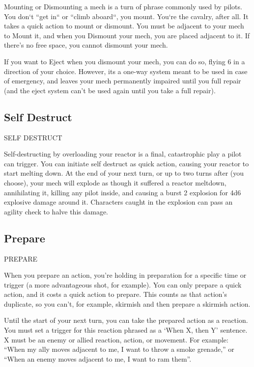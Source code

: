Mounting or Dismounting a mech is a turn of phrase commonly used by pilots. You don‘t “get  
in“ or “climb aboard“, you mount. You‘re the cavalry, after all. It takes a quick action to mount or  
dismount. You must be adjacent to your mech to Mount it, and when you Dismount your mech,  
you are placed adjacent to it. If there’s no free space, you cannot dismount your mech.
 

If you want to Eject when you dismount your mech, you can do so, flying 6 in a direction of your  
choice. However, its a one-way system meant to be used in case of emergency, and leaves your  
mech permanently impaired until you full repair (and the eject system can’t be used again until  
you take a full repair).
 
\subsection{Self Destruct}
                                          SELF DESTRUCT  

Self-destructing by overloading your reactor is a final, catastrophic play a pilot can trigger. You  
can initiate self destruct as quick action, causing your reactor to start melting down. At the end  
of your next turn, or up to two turns after (you choose), your mech will explode as though it  
suffered a reactor meltdown, annihilating it, killing any pilot inside, and causing a burst 2  
explosion for 4d6 explosive damage around it. Characters caught in the explosion can pass an  
agility check to halve this damage.  
\subsection{Prepare}
                                                PREPARE  

When you prepare an action, you’re holding in preparation for a specific time or trigger (a more  
advantageous shot, for example). You can only prepare a quick action, and it costs a quick  
action to prepare. This counts as that action’s duplicate, so you can’t, for example, skirmish and  
then prepare a skirmish action.
 

Until the start of your next turn, you can take the prepared action as a reaction. You must set a  
trigger for this reaction phrased as a ‘When X, then Y’ sentence. X must be an enemy or allied  
reaction, action, or movement. For example: “When my ally moves adjacent to me, I want to  
throw a smoke grenade,” or “When an enemy moves adjacent to me, I want to ram them”.
 

